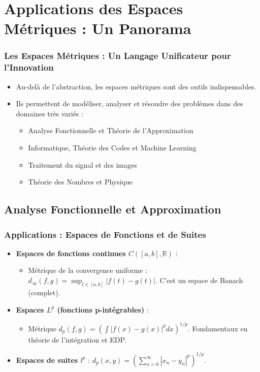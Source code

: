 \documentclass{beamer}
\begin{document}
\section*{Applications des Espaces Métriques : Un Panorama}
\begin{frame}
    \frametitle{Les Espaces Métriques : Un Langage Unificateur pour l'Innovation}
    \begin{itemize}
        \item Au-delà de l'abstraction, les espaces métriques sont des outils indispensables.
        \item Ils permettent de modéliser, analyser et résoudre des problèmes dans des domaines très variés :
            \begin{itemize}
                \item Analyse Fonctionnelle et Théorie de l'Approximation
                \item Informatique, Théorie des Codes et Machine Learning
                \item Traitement du signal et des images
                \item Théorie des Nombres et Physique
            \end{itemize}
    \end{itemize}
\end{frame}

\subsection*{Analyse Fonctionnelle et Approximation}
\begin{frame}
    \frametitle{Applications : Espaces de Fonctions et de Suites}
    \begin{itemize}
        \item \textbf{Espaces de fonctions continues $C([a,b], \mathbb{R})$} :
            \begin{itemize}
                \item Métrique de la convergence uniforme : $d_\infty(f,g) = \sup_{t \in [a,b]} |f(t) - g(t)|$. C'est un espace de Banach (complet).
            \end{itemize}
        \item \textbf{Espaces $L^p$ (fonctions p-intégrables)} :
            \begin{itemize}
                \item Métrique $d_p(f,g) = \left( \int |f(x)-g(x)|^p dx \right)^{1/p}$. Fondamentaux en théorie de l'intégration et EDP.
            \end{itemize}
        \item \textbf{Espaces de suites $l^p$} : $d_p(x,y) = \left( \sum_{n=0}^\infty |x_n - y_n|^p \right)^{1/p}$.
    \end{itemize}
\end{frame}
\end{document}
